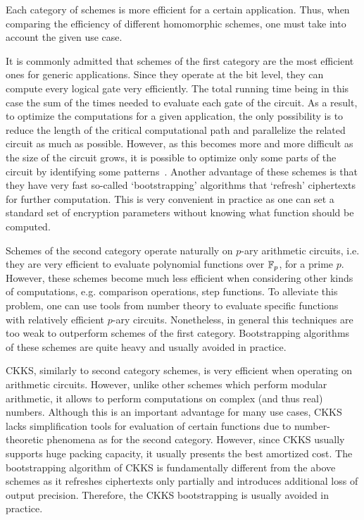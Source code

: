 Each category of schemes is more efficient for a certain application. 
Thus, when comparing the efficiency of different homomorphic schemes, one must take into account the given use case.

It is commonly admitted that schemes of the first category are the most efficient ones for generic applications. 
Since they operate at the bit level, they can compute every logical gate very efficiently. 
The total running time being in this case the sum of the times needed to evaluate each gate of the circuit. 
As a result, to optimize the computations for a given application, the only possibility is to reduce the length of the critical computational path and parallelize the related circuit as much as possible. 
However, as this becomes more and more difficult as the size of the circuit grows, it is possible to optimize only some parts of the circuit by identifying some patterns~\cite{ACS20}.
Another advantage of these schemes is that they have very fast so-called `bootstrapping' algorithms that `refresh' ciphertexts for further computation.
This is very convenient in practice as one can set a standard set of encryption parameters without knowing what function should be computed. 

Schemes of the second category operate naturally on $p$-ary arithmetic circuits, i.e. they are very efficient to evaluate polynomial functions over $\mathbb{F}_p$, for a prime $p$.
However, these schemes become much less efficient when considering other kinds of computations, e.g. comparison operations, step functions. 
To alleviate this problem, one can use tools from number theory to evaluate specific functions with relatively efficient $p$-ary circuits. 
Nonetheless, in general this techniques are too weak to outperform schemes of the first category.
Bootstrapping algorithms of these schemes are quite heavy and usually avoided in practice. 

CKKS, similarly to second category schemes, is very efficient when operating on arithmetic circuits. 
However, unlike other schemes which perform modular arithmetic, it allows to perform computations on complex (and thus real) numbers. 
Although this is an important advantage for many use cases, CKKS lacks simplification tools for evaluation of certain functions due to number-theoretic phenomena as for the second category. 
However, since CKKS usually supports huge packing capacity, it usually presents the best amortized cost.
The bootstrapping algorithm of CKKS is fundamentally different from the above schemes as it refreshes ciphertexts only partially and introduces additional loss of output precision.
Therefore, the CKKS bootstrapping is usually avoided in practice. 


